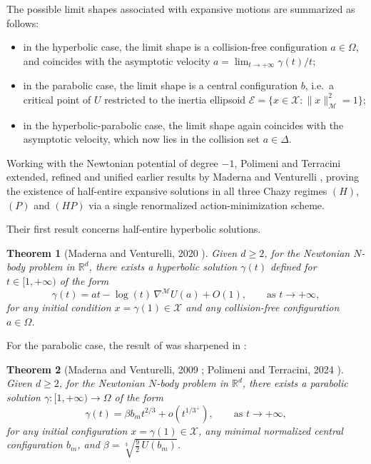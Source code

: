 \documentclass[a4paper,10pt]{amsart}
\theoremstyle{plain}
\newtheorem{thm}{Theorem}
\theoremstyle{definition}
\numberwithin{equation}{section}
\numberwithin{thm}{section}
\begin{document}
The possible limit shapes associated with expansive motions are summarized as follows:
\begin{itemize}
\item in the hyperbolic case, the limit shape is a collision-free configuration $a\in\Omega$, and coincides with the asymptotic velocity $a=\lim_{t\rightarrow+\infty}\gamma(t)/t$;
\item in the parabolic case, the limit shape is a central configuration $b$, i.e.\ a critical point of $U$ restricted to the inertia ellipsoid
$\mathcal{E}=\{x\in\mathcal{X}:\|x\|_{\mathcal M}^2=1\}$;
\item in the hyperbolic-parabolic case, the limit shape again coincides with the asymptotic velocity, which now lies in the collision set $a\in\Delta$.
\end{itemize}

Working with the Newtonian potential of degree $-1$, Polimeni and Terracini \cite{PolimeniTerracini} extended, refined and unified earlier results by Maderna and Venturelli \cite{MadernaVenturelli_GloballyMinimizingParabolic,MadernaVenturelli_HyperbolicMotions}, proving the existence of half-entire expansive solutions in all three Chazy regimes $(H)$, $(P)$ and $(HP)$ via a single renormalized action-minimization scheme.

Their first result concerns half-entire hyperbolic solutions.

\begin{thm}[Maderna and Venturelli, 2020 \cite{MadernaVenturelli_HyperbolicMotions}]\label{thm_hyperbolic}
Given $d\ge 2$, for the Newtonian $N$-body problem in $\mathbb{R}^d$, there exists a hyperbolic solution $\gamma(t)$ defined for $t\in[1,+\infty)$ of the form
\begin{equation}\label{e:MV}
\gamma(t)=at-\log(t)\,\nabla^{\mathcal{M}}U(a)+O(1),
\qquad\text{as }t\to+\infty,
\end{equation}
for any initial condition $x=\gamma(1)\in\mathcal{X}$ and any collision-free configuration $a\in\Omega$.
\end{thm}

For the parabolic case, the result of \cite{MadernaVenturelli_GloballyMinimizingParabolic} was sharpened in \cite{PolimeniTerracini}:

\begin{thm}[Maderna and Venturelli, 2009 \cite{MadernaVenturelli_GloballyMinimizingParabolic}; Polimeni and Terracini, 2024 \cite{PolimeniTerracini}]\label{thm_parabolic}
Given $d\ge 2$, for the Newtonian $N$-body problem in $\mathbb{R}^d$, there exists a parabolic solution $\gamma:[1,+\infty)\to\Omega$ of the form
\begin{equation}\label{eq:parabolic_MVPT}
\gamma(t)=\beta b_m t^{2/3}+o(t^{1/3^+}),
\qquad\text{as }t\to+\infty,
\end{equation}
for any initial configuration $x=\gamma(1)\in\mathcal{X}$, any minimal normalized central configuration $b_m$, and $\beta=\sqrt[3]{\frac92\,U(b_m)}$.
\end{thm}
\end{document}
